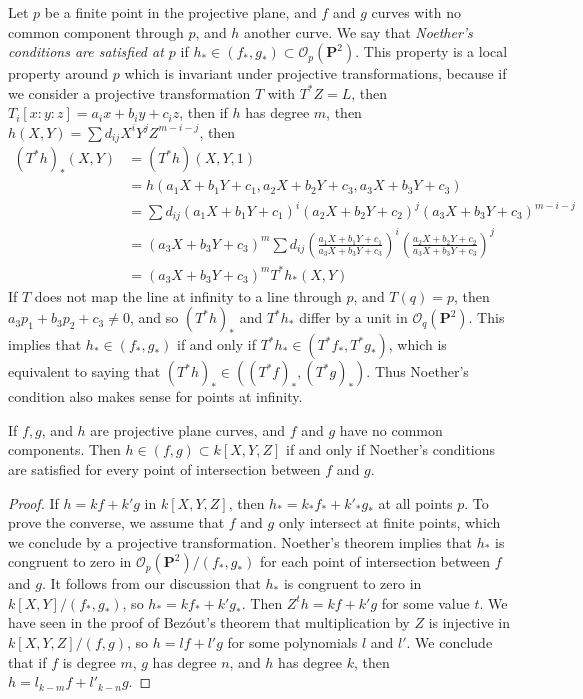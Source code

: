 Let $p$ be a finite point in the projective plane, and $f$ and $g$ curves with no common component through $p$, and $h$ another curve. We say that \emph{Noether's conditions are satisfied at $p$} if $h_* \in (f_*, g_*) \subset \mathcal{O}_p(\mathbf{P}^2)$. This property is a local property around $p$ which is invariant under projective transformations, because if we consider a projective transformation $T$ with $T^*Z = L$, then
%
$T_i[x:y:z] = a_ix + b_iy + c_iz$, then if $h$ has degree $m$, then $h(X,Y) = \sum d_{ij}X^iY^jZ^{m-i-j}$, then
%
\begin{align*}
    (T^*h)_*(X,Y) &= (T^*h)(X,Y,1)\\
    &= h(a_1X + b_1Y + c_1, a_2X + b_2Y + c_3, a_3X + b_3Y + c_3)\\
    &= \sum d_{ij} (a_1X + b_1Y + c_1)^i(a_2X + b_2Y + c_2)^j(a_3X + b_3Y + c_3)^{m-i-j}\\
    &= (a_3X + b_3Y + c_3)^m \sum d_{ij} \left( \frac{a_1X + b_1Y + c_1}{a_3X + b_3Y + c_3} \right)^i \left( \frac{a_2X + b_2Y + c_2}{a_3X + b_3Y + c_3} \right)^j\\
    &= (a_3X + b_3Y + c_3)^m T^*h_*(X,Y)
\end{align*}
%
If $T$ does not map the line at infinity to a line through $p$, and $T(q) = p$, then $a_3p_1 + b_3p_2 + c_3 \neq 0$, and so $(T^*h)_*$ and $T^*h_*$ differ by a unit in $\mathcal{O}_q(\mathbf{P}^2)$. This implies that $h_* \in (f_*, g_*)$ if and only if $T^*h_* \in (T^*f_*, T^*g_*)$, which is equivalent to saying that $(T^*h)_* \in ((T^*f)_*, (T^*g)_*)$. Thus Noether's condition also makes sense for points at infinity.

\begin{theorem}
    If $f,g$, and $h$ are projective plane curves, and $f$ and $g$ have no common components. Then $h \in (f,g) \subset k[X,Y,Z]$ if and only if Noether's conditions are satisfied for every point of intersection between $f$ and $g$.
\end{theorem}
\begin{proof}
    If $h = kf + k'g$ in $k[X,Y,Z]$, then $h_* = k_*f_* + k'_* g_*$ at all points $p$. To prove the converse, we assume that $f$ and $g$ only intersect at finite points, which we conclude by a projective transformation. Noether's theorem implies that $h_*$ is congruent to zero in $\mathcal{O}_p(\mathbf{P}^2)/(f_*,g_*)$ for each point of intersection between $f$ and $g$. It follows from our discussion that $h_*$ is congruent to zero in $k[X,Y]/(f_*,g_*)$, so $h_* = kf_* + k'g_*$. Then $Z^th = kf + k'g$ for some value $t$. We have seen in the proof of Bez\'{o}ut's theorem that multiplication by $Z$ is injective in $k[X,Y,Z]/(f,g)$, so $h = lf + l'g$ for some polynomials $l$ and $l'$. We conclude that if $f$ is degree $m$, $g$ has degree $n$, and $h$ has degree $k$, then $h = l_{k-m}f + l'_{k-n}g$.
\end{proof}

